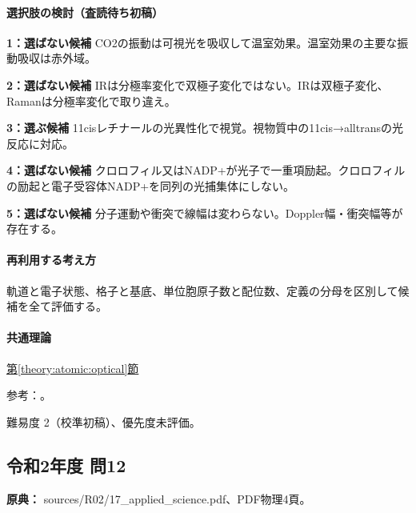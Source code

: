 \paragraph{選択肢の検討（査読待ち初稿）}\mbox{}\par

\noindent\textbf{1：選ばない候補} CO2の振動は可視光を吸収して温室効果。温室効果の主要な振動吸収は赤外域。\par

\noindent\textbf{2：選ばない候補} IRは分極率変化で双極子変化ではない。IRは双極子変化、Ramanは分極率変化で取り違え。\par

\noindent\textbf{3：選ぶ候補} 11cisレチナールの光異性化で視覚。視物質中の11cis→alltransの光反応に対応。\par

\noindent\textbf{4：選ばない候補} クロロフィル又はNADP+が光子で一重項励起。クロロフィルの励起と電子受容体NADP+を同列の光捕集体にしない。\par

\noindent\textbf{5：選ばない候補} 分子運動や衝突で線幅は変わらない。Doppler幅・衝突幅等が存在する。\par

\paragraph{再利用する考え方} 軌道と電子状態、格子と基底、単位胞原子数と配位数、定義の分母を区別して候補を全て評価する。

\paragraph{共通理論} \hyperref[theory:atomic:optical]{第\ref*{theory:atomic:optical}節}

\par 参考：\cite{atomic_retinal,atomic_ir_raman,atomic_linewidth,atomic_photosynthesis,atomic_ir_co2}。

\par 難易度 2（校準初稿）、優先度未評価。

\subsection{令和2年度 問12}
\label{q:r02-reg-applied-12}

\noindent\textbf{原典：} sources/R02/17\_applied\_science.pdf、PDF物理4頁。

